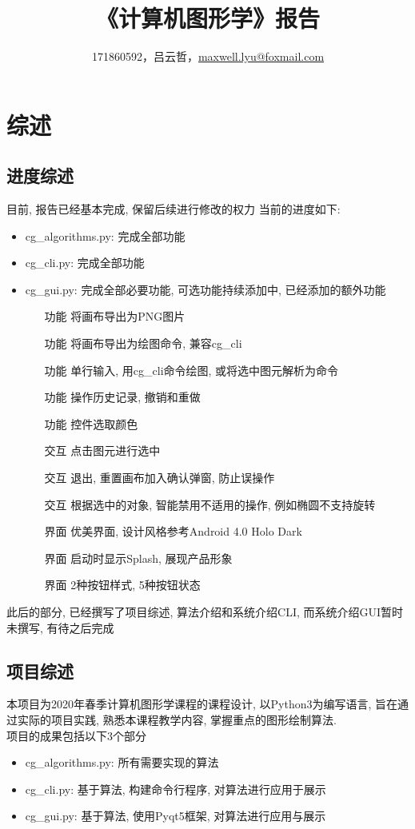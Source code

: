 \documentclass[a4paper,UTF8]{article}
\theoremstyle{definition}
\begin{document}
\title{\textbf{《计算机图形学》报告}}
\author{171860592，吕云哲，\href{mailto:maxwell.lyu@foxmail.com}{maxwell.lyu@foxmail.com}}
\maketitle

\tableofcontents
\newpage

\section{综述}
\subsection{进度综述}
  目前, 报告已经基本完成, 保留后续进行修改的权力
  当前的进度如下: 
  \begin{itemize}
    \item cg\_algorithms.py: 完成全部功能
    \item cg\_cli.py: 完成全部功能
    \item cg\_gui.py: 完成全部必要功能, 可选功能持续添加中, 已经添加的额外功能
    \begin{itemize}
      \item [功能]将画布导出为PNG图片
      \item [功能]将画布导出为绘图命令, 兼容cg\_cli
      \item [功能]单行输入, 用cg\_cli命令绘图, 或将选中图元解析为命令
      \item [功能]操作历史记录, 撤销和重做
      \item [功能]控件选取颜色
      \item [交互]点击图元进行选中
      \item [交互]退出, 重置画布加入确认弹窗, 防止误操作
      \item [交互]根据选中的对象, 智能禁用不适用的操作, 例如椭圆不支持旋转
      \item [界面]优美界面, 设计风格参考Android 4.0 Holo Dark
      \item [界面]启动时显示Splash, 展现产品形象
      \item [界面]2种按钮样式, 5种按钮状态
    \end{itemize}
  \end{itemize}
  此后的部分, 已经撰写了项目综述, 算法介绍和系统介绍CLI, 而系统介绍GUI暂时未撰写, 有待之后完成
\subsection{项目综述}
  本项目为2020年春季计算机图形学课程的课程设计, 以Python3为编写语言, 旨在通过实际的项目实践, 熟悉本课程教学内容, 掌握重点的图形绘制算法.\\
  项目的成果包括以下3个部分
  \begin{itemize}
    \item cg\_algorithms.py: 所有需要实现的算法
    \item cg\_cli.py: 基于算法, 构建命令行程序, 对算法进行应用于展示
    \item cg\_gui.py: 基于算法, 使用Pyqt5框架, 对算法进行应用与展示
  \end{itemize}
\end{document}
